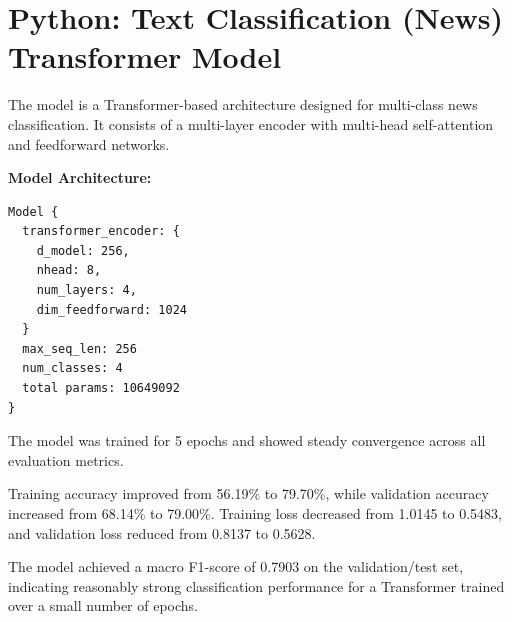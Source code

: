 \documentclass[11pt,a4paper]{article}
\begin{document}
\section{Python: Text Classification (News) Transformer Model}

The model is a Transformer-based architecture designed for multi-class news classification. It consists of a multi-layer encoder with multi-head self-attention and feedforward networks.

\textbf{Model Architecture:}

\begin{verbatim}
Model {
  transformer_encoder: {
    d_model: 256,
    nhead: 8,
    num_layers: 4,
    dim_feedforward: 1024
  }
  max_seq_len: 256
  num_classes: 4
  total params: 10649092
}
\end{verbatim}

The model was trained for 5 epochs and showed steady convergence across all evaluation metrics.

Training accuracy improved from 56.19\% to 79.70\%, while validation accuracy increased from 68.14\% to 79.00\%. 
Training loss decreased from 1.0145 to 0.5483, and validation loss reduced from 0.8137 to 0.5628.

The model achieved a macro F1-score of 0.7903 on the validation/test set, indicating reasonably strong classification performance for a Transformer trained over a small number of epochs.
\end{document}
